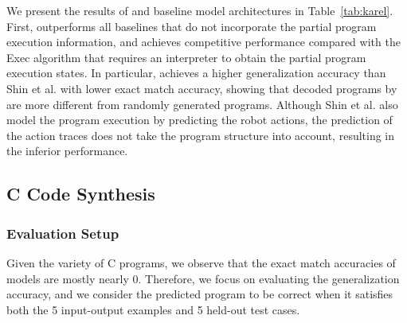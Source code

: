We present the results of {\ours} and baseline model architectures in Table~\ref{tab:karel}. First, {\ours} outperforms all baselines that do not incorporate the partial program execution information, and achieves competitive performance compared with the Exec algorithm that requires an interpreter to obtain the partial program execution states. In particular, {\ours} achieves a higher generalization accuracy than Shin et al. with lower exact match accuracy, showing that decoded programs by \ours{} are more different from randomly generated programs. Although Shin et al. also model the program execution by predicting the robot actions, the prediction of the action traces does not take the program structure into account, resulting in the inferior performance.
\vspace{-0.1em}
\subsection{C Code Synthesis}
\subsubsection{Evaluation Setup}
\label{sec:exp-c-setup}
Given the variety of C programs, we observe that the exact match accuracies of models are mostly nearly 0. Therefore, we focus on evaluating the generalization accuracy, and we consider the predicted program to be correct when it satisfies both the 5 input-output examples and 5 held-out test cases.

